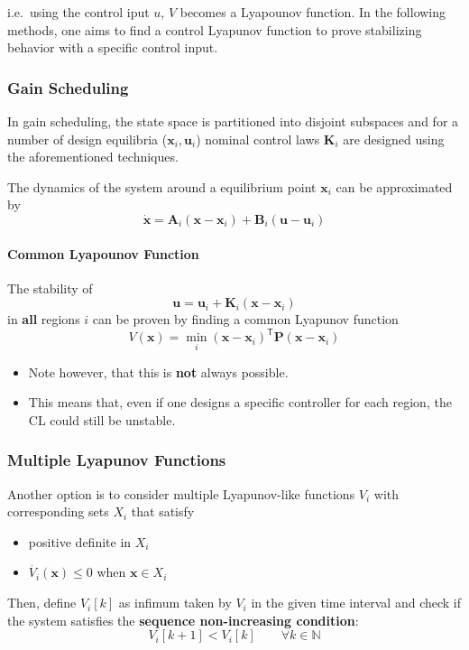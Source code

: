 i.e.\ using the control iput $u$, $V$ becomes a Lyapounov function. In the following methods, one aims to find a control Lyapunov function to prove stabilizing behavior with a specific control input.

\subsubsection{Gain Scheduling}
In gain scheduling, the state space is partitioned into disjoint subspaces and for a number of design equilibria ($\mathbf{x}_i, \mathbf{u}_i$)  nominal control laws $\mathbf{K}_i$ are designed using the aforementioned techniques.

\newpar{}
The dynamics of the system around a equilibrium point $\mathbf{x}_i$ can be approximated by
\noindent\begin{equation*}
    \dot{\mathbf{x}} = \mathbf{A}_i(\mathbf{x}-\mathbf{x}_i) + \mathbf{B}_i(\mathbf{u}-\mathbf{u}_i)
\end{equation*}

\paragraph{Common Lyapounov Function}
The stability of
\noindent\begin{equation*}
    \mathbf{u} = \mathbf{u}_i+\mathbf{K}_i(\mathbf{x}-\mathbf{x}_i)
\end{equation*}
in \textbf{all} regions $i$ can be proven by finding a common Lyapunov function
\noindent\begin{equation*}
    V(\mathbf{x}) = \min_{i} {(\mathbf{x}-\mathbf{x}_i)}^{\mathsf{T}}\mathbf{P}(\mathbf{x}-\mathbf{x}_i)
\end{equation*}
\begin{itemize}
    \item Note however, that this is \textbf{not} always possible.
    \item This means that, even if one designs a specific controller for each region, the CL could still be unstable.

\end{itemize}

\subsubsection{Multiple Lyapunov Functions}
Another option is to consider multiple Lyapunov-like functions $V_i$ with corresponding sets $X_i$ that satisfy
\begin{itemize}
    \item positive definite in $X_i$
    \item $\dot{V_i}(\mathbf{x})\leq 0$ when $\mathbf{x}\in X_i$
\end{itemize}
Then, define $V_i[k]$ as infimum taken by $V_i$ in the given time interval and check if the system satisfies the \textbf{sequence non-increasing condition}:
\noindent\begin{equation*}
    V_i[k+1] < V_i[k] \qquad \forall k \in \mathbb{N}
\end{equation*}

